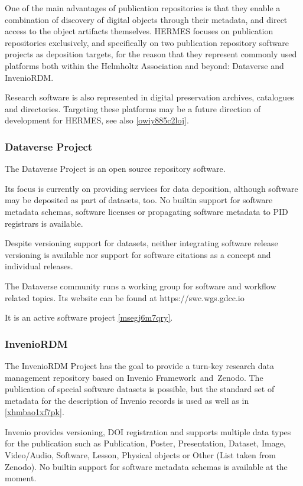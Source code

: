 \documentclass{article}
\begin{document}
One of the main advantages of publication repositories is that they enable a combination of discovery of digital objects through their metadata, and direct access to the object artifacts themselves. HERMES focuses on publication repositories exclusively, and specifically on two publication repository software projects as deposition targets, for the reason that they represent commonly used platforms both within the Helmholtz Association and beyond: Dataverse and InvenioRDM.

Research software is also represented in digital preservation archives, catalogues and directories. Targeting these platforms may be a future direction of development for HERMES, see also \ref{owiy885c2loj}.



\subsubsection{Dataverse Project}\label{adb4j1s8jlul}
The Dataverse Project is an open source repository software.

Its focus is currently on providing services for data deposition, although software may be deposited as part of datasets, too. No builtin support for software metadata schemas, software licenses or propagating software metadata to PID registrars is available.

Despite versioning support for datasets, neither integrating software release versioning is available nor support for software citations as a concept and individual releases.

The Dataverse community runs a working group for software and workflow related topics. Its website can be found at https://swc.wgs.gdcc.io

It is an active software project \ref{msegj6m7qry}.



\subsubsection{InvenioRDM}\label{vym1mq9h5jxs}
The InvenioRDM Project has the goal to provide a turn-key research data management repository based on Invenio Framework and Zenodo. The publication of special software datasets is possible, but the standard set of metadata for the description of Invenio records is used as well as in \ref{xhmbao1xf7pk}.

Invenio provides versioning, DOI registration and supports multiple data types for the publication such as Publication, Poster, Presentation, Dataset, Image, Video/Audio, Software, Lesson, Physical objects or Other (List taken from Zenodo). No builtin support for software metadata schemas is available at the moment. 
\end{document}
